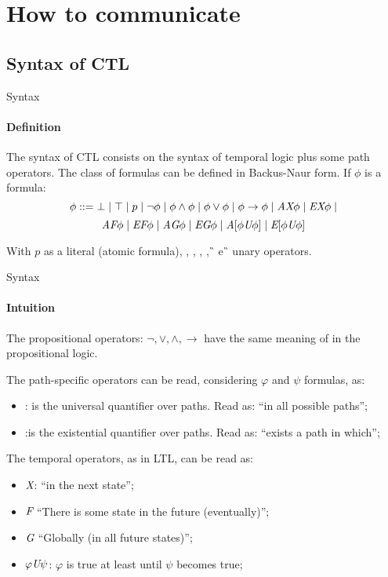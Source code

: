 \section{How to communicate}
\subsection{Syntax of CTL}
\begin{frame}{Syntax}
	\framesubtitle{Definition}
	The syntax of CTL consists on the syntax of temporal logic plus some path operators. The class of formulas can be defined in Backus-Naur form. If $\phi$ is a formula: \pause
	$$\phi ::= \bot \; | \; \top \; | \; p \; | \; \neg \phi \; | \; \phi \land \phi \; | \; \phi \lor \phi \; | \; \phi \to \phi \; | \; \textit{A}\textit{X} \phi \; | \; \textit{E}\textit{X} \phi \; | $$
	$$\textit{A}\textit{F} \phi \; | \; \textit{E}\textit{F} \phi \; | \; \textit{A}\textit{G} \phi \; | \; \textit{E}\textit{G} \phi \; | \; \textit{A}[\phi \textit{U} \phi] \; | \; \textit{E}[\phi \textit{U} \phi]$$\pause
	
	With $p$ as a literal (atomic formula), \A\X, \E\X, \A\F, \E\F, \A\G \, e \E\G \, unary operators.
	
\end{frame}

\begin{frame}{Syntax}
	\framesubtitle{Intuition}
	The propositional operators: $\neg, \lor, \land, \to$ have the same meaning of in the propositional logic.\pause
	
	The path-specific operators can be read, considering $\varphi$ and $\psi$ formulas, as: \pause
    \begin{itemize}
		\item 
		{
			\A: is the universal quantifier over paths. Read as: ``in all possible paths'';
			\pause
		}
		\item 
		{
			\E:is the existential quantifier over paths. Read as: ``exists a path in which'';
			\pause
		}
	\end{itemize}
	
    The temporal operators, as in LTL, can be read as:
	\begin{itemize}
    	\item 
    	{
    		$\textit{X}$: ``in the next state'';
    		\pause
    	}
    	\item 
    	{
    		$\textit{F}$ ``There is some state in the future (eventually)'';
    		\pause
    	}
    	\item
    	{
    		$\textit{G}$ ``Globally (in all future states)'';
    		\pause
    	}
    	\item
    	{
    		$\varphi \textit{U} \psi$: $\varphi$ is true at least until $\psi$ becomes true;	
    	}
    \end{itemize}

\end{frame}

